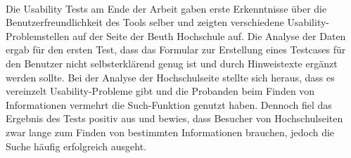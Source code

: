 \\
Die Usability Tests am Ende der Arbeit gaben erste Erkenntnisse über die Benutzerfreundlichkeit des Tools selber und zeigten verschiedene Usability-Problemstellen auf der Seite der Beuth Hochschule auf. Die Analyse der Daten ergab für den ersten Test, dass das Formular zur Erstellung eines Testcases für den Benutzer nicht selbsterklärend genug ist und durch Hinweistexte ergänzt werden sollte. Bei der Analyse der Hochschulseite stellte sich heraus, dass es vereinzelt Usability-Probleme gibt und die Probanden beim Finden von Informationen vermehrt die Such-Funktion genutzt haben. Dennoch fiel das Ergebnis des Tests positiv aus und bewies, dass Besucher von Hochschulseiten zwar lange zum Finden von bestimmten Informationen brauchen, jedoch die Suche häufig erfolgreich ausgeht.